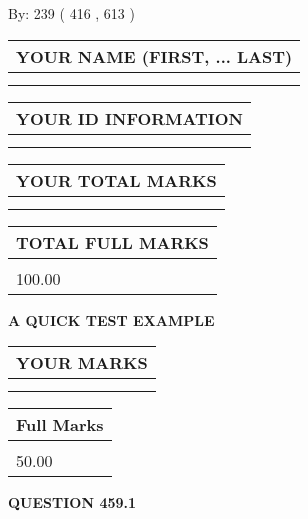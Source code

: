 \documentclass[12pt]{article}
\begin{document}
   
\hspace{1.0in} By: 
 239 ( 416 ,  613 )
   
   
   
   
\newpage 
\setcounter{page}{ 
   459001 } 
   
   
   
   
\noindent\begin{tabular}{|l|}
\hline
YOUR NAME (FIRST, ... LAST)  \\
\hline
 \\ 
 \\ 
\hline
\end{tabular}
\hspace{0.05in} \begin{tabular}{|l|}
\hline
 YOUR   ID   INFORMATION  \\
\hline
 \\ 
 \\ 
\hline
\end{tabular}
   
   
\vspace{0.2in}\noindent\begin{tabular}{|l|}
\hline
YOUR TOTAL MARKS  \\
\hline
 \\ 
 \\ 
\hline
\end{tabular}
\hspace{0.05in} \begin{tabular}{|l|}
\hline
TOTAL FULL MARKS  \\
\hline
 \\ 
100.00 \\
\hline
\end{tabular}
   
   
 \vspace{0.2in}
{\LARGE {\textbf{ A QUICK TEST EXAMPLE}}}
   
   
  
\vspace{0.2in}
  
\noindent\begin{tabular}{|l|}
\hline
 YOUR MARKS  \\
\hline
 \\ 
 \\ 
\hline
\end{tabular}
\hspace{0.05in} \begin{tabular}{|l|}
\hline
 Full Marks  \\
\hline
 \\ 
50.00 \\
\hline
\end{tabular}
{\textbf{\Large{QUESTION
459.1 
}}}
  
\end{document}
